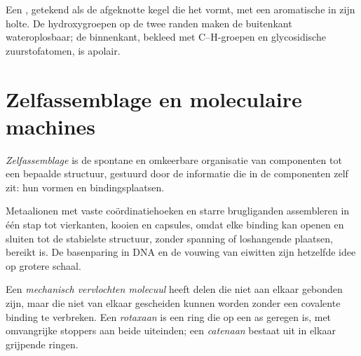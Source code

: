 \begin{omfigure}

{\small Een , getekend als de afgeknotte kegel die het vormt,
met een aromatische  in zijn holte. De hydroxygroepen op de twee
randen maken de buitenkant wateroplosbaar; de binnenkant, bekleed met
C--H-groepen en glycosidische zuurstofatomen, is apolair.}
\end{omfigure}

\section{Zelfassemblage en moleculaire machines}

\begin{definition}[Zelfassemblage]\label{def:b3:supramolecular:self-assembly}
\emph{Zelfassemblage} is de spontane en omkeerbare
organisatie van componenten tot een bepaalde structuur, gestuurd door de
informatie die in de componenten zelf zit: hun vormen en
bindingsplaatsen.
\end{definition}

Metaalionen met vaste coördinatiehoeken en starre brugliganden
assembleren in één stap tot vierkanten, kooien en capsules, omdat elke
binding kan openen en sluiten tot de stabielste structuur, zonder
spanning of loshangende plaatsen, bereikt is. De basenparing in DNA en de
vouwing van eiwitten zijn hetzelfde idee op grotere schaal.

\begin{definition}\label{def:b3:supramolecular:interlocked}
Een \emph{mechanisch vervlochten molecuul}
heeft delen die niet aan elkaar gebonden zijn, maar die niet van elkaar
gescheiden kunnen worden zonder een covalente binding te verbreken. Een
\emph{rotaxaan} is een ring die op een as geregen is, met
omvangrijke stoppers aan beide uiteinden; een
\emph{catenaan} bestaat uit in elkaar grijpende ringen.
\end{definition}

